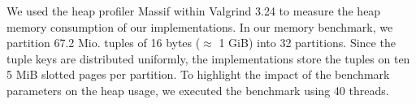 

We used the heap profiler Massif within Valgrind 3.24 to measure the heap memory consumption of our implementations.
In our memory benchmark, we partition 67.2 Mio.
tuples of 16 bytes ($\approx$ 1 GiB) into 32 partitions.
Since the tuple keys are distributed uniformly, the implementations store the tuples on ten 5 MiB slotted pages per partition.
To highlight the impact of the benchmark parameters on the heap usage, we executed the benchmark using 40 threads.

